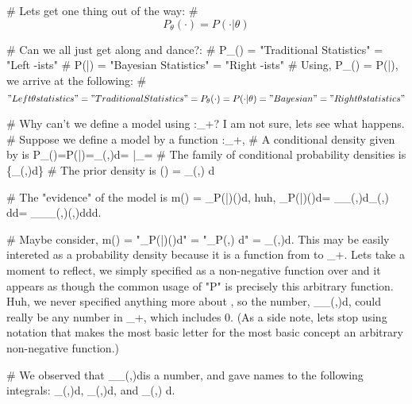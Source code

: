 # Lets get one thing out of the way:
# \[ P_\theta(\cdot) = P(\cdot|\theta) \]

# Can we all just get along and dance?:
# P_\theta(\cdot) = "Traditional Statistics" = "Left \theta-ists"
# P(\cdot|\theta) = "Bayesian Statistics" = "Right \theta-ists" 
# Using, P_\theta(\cdot) = P(\cdot|\theta), we arrive at the following:
# \[ "Left \theta statistics" = "Traditional Statistics" = P_\theta(\cdot) = P(\cdot|\theta) = "Bayesian" = "Right \theta statistics" \]

# Why can't we define a model using :\Omega\times\Theta\to{}_+? I am not sure, lets see what happens.
# Suppose we define a model by a function :\Omega\times\Theta\to{}_+,
# A conditional density given by \theta is P_\theta(\cdot)=P(\cdot|\theta)=\int_\Omega {}(\cdot,\theta)d\omega = |_{\vartheta=\theta}
# The family of conditional probability densities is \{\int_\Omega {}(\cdot,\theta)d\omega \mid \theta\in\Theta\}
# The prior density is \pi(\cdot) = \int_\Omega {}(\omega,\cdot) d\omega

# The "evidence" of the model is m(\cdot) = \int_\Theta P(\cdot|\theta)\pi(\theta)d\theta, huh, \int_\Theta P(\cdot|\theta)\pi(\theta)d\theta = \int_\Theta \int_\Omega {}(\cdot,\theta)d\omega \int_\Omega {}(\omega,\theta) d\omega d\theta = \int_\Theta \int_\Omega \int_\Omega {}(\cdot,\theta)(\omega,\theta)d\omega d\omega d\theta.

# Maybe consider, m(\cdot) = "\int_\Theta P(\cdot|\theta)\pi(\theta)d\theta" = "\int_\Theta P(\cdot,\theta) d\theta" = \int_\Theta{}(\cdot,\theta)d\theta. This may be easily intereted as a probability density because it is a function from \Omega to _+. Lets take a moment to reflect, we simply specified  as a non-negative function over \Omega\times\Theta and it appears as though the common usage of "P" is precisely this arbitrary function. Huh, we never specified anything more about , so the number, \int_\Omega\int_\Theta {}(\omega,\theta)d\omegad\theta, could really be any number in _+, which includes 0. (As a side note, lets stop using notation that makes the most basic letter for the most basic concept an arbitrary non-negative function.)

# We observed that \int_\Omega\int_\Theta {}(\omega,\theta)d\omegad\theta is a number, and gave names to the following integrals: \int_\Omega {}(\cdot,\theta)d\omega, \int_\Omega {}(\omega,\cdot)d\omega, and \int_\Theta {}(\cdot,\theta) d\theta.


